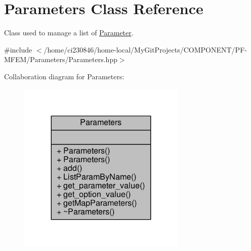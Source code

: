 \hypertarget{classParameters}{}\section{Parameters Class Reference}
\label{classParameters}


Class used to manage a list of \hyperlink{classParameter}{Parameter}.  




{\ttfamily \#include $<$/home/ci230846/home-\/local/\+My\+Git\+Projects/\+C\+O\+M\+P\+O\+N\+E\+N\+T/\+P\+F-\/\+M\+F\+E\+M/\+Parameters/\+Parameters.\+hpp$>$}



Collaboration diagram for Parameters\+:\nopagebreak
\begin{figure}[H]
\begin{center}
\leavevmode
\includegraphics[width=227pt]{classParameters__coll__graph}
\end{center}
\end{figure}
